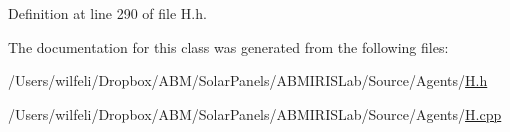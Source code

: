 Definition at line 290 of file H.\+h.



The documentation for this class was generated from the following files\+:\begin{DoxyCompactItemize}
\item 
/\+Users/wilfeli/\+Dropbox/\+A\+B\+M/\+Solar\+Panels/\+A\+B\+M\+I\+R\+I\+S\+Lab/\+Source/\+Agents/\hyperlink{_h_8h}{H.\+h}\item 
/\+Users/wilfeli/\+Dropbox/\+A\+B\+M/\+Solar\+Panels/\+A\+B\+M\+I\+R\+I\+S\+Lab/\+Source/\+Agents/\hyperlink{_h_8cpp}{H.\+cpp}\end{DoxyCompactItemize}
